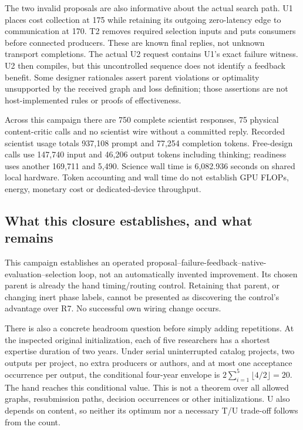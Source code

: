 The two invalid proposals are also informative about the actual search path.
U1 places cost collection at 175 while retaining its outgoing zero-latency
edge to communication at 170. T2 removes required selection inputs and puts
consumers before connected producers. These are known final replies, not
unknown transport completions. The actual U2 request contains U1's exact
failure witness. U2 then compiles, but this uncontrolled sequence does not
identify a feedback benefit. Some designer rationales assert parent violations
or optimality unsupported by the received graph and loss definition; those
assertions are not host-implemented rules or proofs of effectiveness.

Across this campaign there are 750 complete scientist responses, 75 physical
content-critic calls and no scientist wire without a committed reply. Recorded
scientist usage totals 937,108 prompt and 77,254 completion tokens. Free-design
calls use 147,740 input and 46,206 output tokens including thinking; readiness
uses another 169,711 and 5,490. Science wall time is 6,082.936 seconds on shared
local hardware. Token accounting and wall time do not establish GPU FLOPs,
energy, monetary cost or dedicated-device throughput.

\subsection{What this closure establishes, and what remains}
This campaign establishes an operated proposal--failure-feedback--native-
evaluation--selection loop, not an automatically invented improvement. Its
chosen parent is already the hand timing/routing control. Retaining that
parent, or changing inert phase labels, cannot be presented as discovering
the control's advantage over R7. No successful own wiring change occurs.

There is also a concrete headroom question before simply adding repetitions.
At the inspected original initialization, each of five researchers has a
shortest expertise duration of two years. Under serial uninterrupted catalog
projects, two outputs per project, no extra producers or authors, and at most
one acceptance occurrence per output, the conditional four-year envelope is
$2\sum_{i=1}^{5}\lfloor4/2\rfloor=20$. The hand reaches this conditional
value. This is not a theorem over all allowed graphs, resubmission paths,
decision occurrences or other initializations. U also depends on content, so
neither its optimum nor a necessary T/U trade-off follows from the count.

